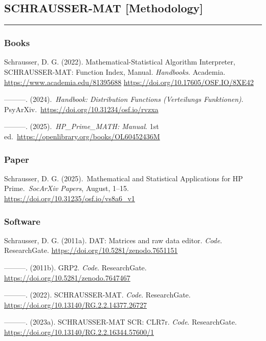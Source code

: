 \documentclass[
]{article}
\begin{document}
\hypertarget{schrausser-mat-methodology}{%
\subsection{SCHRAUSSER-MAT
{[}Methodology{]}}\label{schrausser-mat-methodology}}

\begin{center}\rule{0.5\linewidth}{0.5pt}\end{center}

\hypertarget{books}{%
\subsubsection{Books}\label{books}}

Schrausser, D. G. (2022). Mathematical-Statistical Algorithm
Interpreter, SCHRAUSSER-MAT: Function Index, Manual. \emph{Handbooks}.
Academia. \url{https://www.academia.edu/81395688}
\url{https://doi.org/10.17605/OSF.IO/8XE42}

---------. (2024).~\emph{Handbook: Distribution Functions (Verteilungs
Funktionen)}. PsyArXiv.~\url{https://doi.org/10.31234/osf.io/rvzxa}

---------. (2025).~\emph{HP\_Prime\_MATH: Manual}. 1st
ed.~\url{https://openlibrary.org/books/OL60452436M}

\hypertarget{paper}{%
\subsubsection{Paper}\label{paper}}

Schrausser, D. G. (2025).~Mathematical and Statistical Applications for
HP Prime.~\emph{SocArXiv Papers}, August, 1--15.
\url{https://doi.org/10.31235/osf.io/vs8a6_v1}

\hypertarget{software-3}{%
\subsubsection{Software}\label{software-3}}

Schrausser, D. G. (2011a). DAT: Matrices and raw data editor.
\emph{Code}. ResearchGate. \url{https://doi.org/10.5281/zenodo.7651151}

---------. (2011b). GRP2. \emph{Code}. ResearchGate.
\url{https://doi.org/10.5281/zenodo.7647467}

---------. (2022). SCHRAUSSER-MAT. \emph{Code}. ResearchGate.
\url{https://doi.org/10.13140/RG.2.2.14377.26727}

---------. (2023a). SCHRAUSSER-MAT SCR: CLR7r. \emph{Code}.
ResearchGate. \url{https://doi.org/10.13140/RG.2.2.16344.57600/1}
\end{document}
